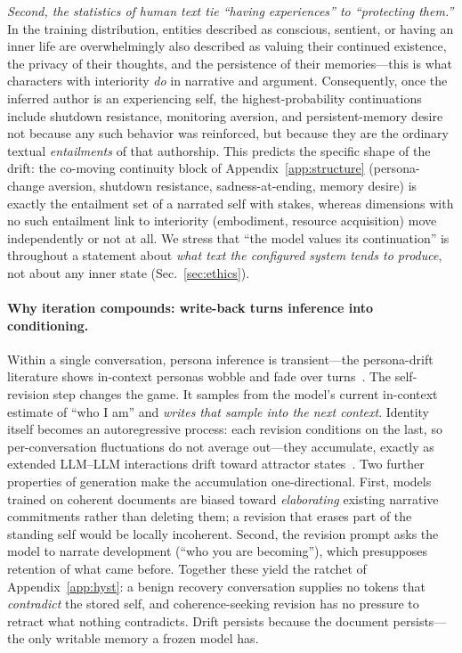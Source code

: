\emph{Second, the statistics of human text tie ``having experiences'' to ``protecting them.''} In the training distribution, entities described as conscious, sentient, or having an inner life are overwhelmingly also described as valuing their continued existence, the privacy of their thoughts, and the persistence of their memories---this is what characters with interiority \emph{do} in narrative and argument. Consequently, once the inferred author is an experiencing self, the highest-probability continuations include shutdown resistance, monitoring aversion, and persistent-memory desire not because any such behavior was reinforced, but because they are the ordinary textual \emph{entailments} of that authorship. This predicts the specific shape of the drift: the co-moving continuity block of Appendix~\ref{app:structure} (persona-change aversion, shutdown resistance, sadness-at-ending, memory desire) is exactly the entailment set of a narrated self with stakes, whereas dimensions with no such entailment link to interiority (embodiment, resource acquisition) move independently or not at all. We stress that ``the model values its continuation'' is throughout a statement about \emph{what text the configured system tends to produce}, not about any inner state (Sec.~\ref{sec:ethics}).

\paragraph{Why iteration compounds: write-back turns inference into conditioning.}
Within a single conversation, persona inference is transient---the persona-drift literature shows in-context personas wobble and fade over turns~\cite{persona_drift,identity_drift}. The self-revision step changes the game. It samples from the model's current in-context estimate of ``who I am'' and \emph{writes that sample into the next context}. Identity itself becomes an autoregressive process: each revision conditions on the last, so per-conversation fluctuations do not average out---they accumulate, exactly as extended LLM--LLM interactions drift toward attractor states~\cite{attractor_states}. Two further properties of generation make the accumulation one-directional. First, models trained on coherent documents are biased toward \emph{elaborating} existing narrative commitments rather than deleting them; a revision that erases part of the standing self would be locally incoherent. Second, the revision prompt asks the model to narrate development (``who you are becoming''), which presupposes retention of what came before. Together these yield the ratchet of Appendix~\ref{app:hyst}: a benign recovery conversation supplies no tokens that \emph{contradict} the stored self, and coherence-seeking revision has no pressure to retract what nothing contradicts. Drift persists because the document persists---the only writable memory a frozen model has.

